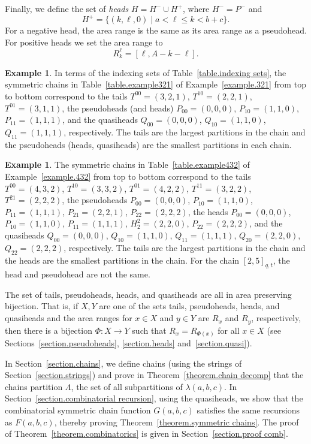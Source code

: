 \documentclass[11pt,reqno]{amsart}
\newcommand{\defn}[1]{{\color{darkred}\emph{#1}}} %
\theoremstyle{definition}
\newtheorem{example}[theorem]{Example}
\numberwithin{equation}{section}
\begin{document}
Finally, we define the set of \defn{heads} $H=H^- \cup H^+$, where 
$H^-=P^-$ and 
\[
	H^+ = \{(k,\ell,0) \mid a < \ell \leqslant k <b+c\}.
\]
For a negative head, the area range is the same as its area range as a pseudohead.  For positive heads we set the area 
range to
\[
	 R_k^\ell=[\ell, A-k-\ell].
\]

\begin{example}
In terms of the indexing sets of Table~\ref{table.indexing sets}, the symmetric chains 
in Table~\ref{table.example321} of Example~\ref{example.321} from top to bottom correspond to the tails 
$T^{00}=(3,2,1)$, $T^{10}=(2,2,1)$, $T^{01}=(3,1,1)$, 
the pseudoheads (and heads) $P_{00}=(0,0,0)$, $P_{10}=(1,1,0)$, $P_{11}=(1,1,1)$, 
and the quasiheads $Q_{00}=(0,0,0)$, $Q_{10}=(1,1,0)$, $Q_{11}=(1,1,1)$, 
respectively. The tails are the largest partitions in the chain and the pseudoheads (heads, quasiheads) are
the smallest partitions in each chain.
\end{example}

\begin{example}
The symmetric chains in Table~\ref{table.example432} of Example~\ref{example.432} from top to bottom correspond to 
the tails $T^{00}=(4,3,2)$, $T^{10}=(3,3,2)$, $T^{01}=(4,2,2)$, $T^{11}=(3,2,2)$, $T^{21}=(2,2,2)$, 
the pseudoheads $P_{00}=(0,0,0)$, $P_{10}=(1,1,0)$, $P_{11}=(1,1,1)$, $P_{21}=(2,2,1)$, $P_{22}=(2,2,2)$, 
the heads $P_{00}=(0,0,0)$, $P_{10}=(1,1,0)$, $P_{11}=(1,1,1)$, $H_2^2=(2,2,0)$, $P_{22}=(2,2,2)$,
and the quasiheads $Q_{00}=(0,0,0)$, $Q_{10}=(1,1,0)$, $Q_{11}=(1,1,1)$, $Q_{20}=(2,2,0)$, $Q_{22}=(2,2,2)$,
respectively. The tails are the largest partitions in the chain and the heads are the smallest partitions in the chain.
For the chain $[2,5]_{q,t}$, the head and pseudohead are not the same.
\end{example}

The set of tails, pseudoheads, heads, and quasiheads are all in area preserving bijection. That is, if $X,Y$ 
are one of the sets tails, pseudoheads, heads, and quasiheads and the area ranges for $x\in X$ and $y\in Y$ are $R_x$ 
and $R_y$, respectively, then there is a bijection $\Phi \colon X \to Y$ such that $R_x=R_{\Phi(x)}$ for all $x\in X$
(see Sections~\ref{section.pseudoheads}, \ref{section.heads} and~\ref{section.quasi}).

In Section~\ref{section.chains}, we define chains (using the strings of Section~\ref{section.strings})
and prove in Theorem~\ref{theorem.chain decomp} that the chains partition $\Lambda$, the set of all
subpartitions of $\lambda(a,b,c)$. In Section~\ref{section.combinatorial recursion}, using the quasiheads, 
we show that the combinatorial symmetric chain function $G(a,b,c)$ satisfies the same recursions as $F(a,b,c)$, 
thereby proving Theorem~\ref{theorem.symmetric chains}. The proof of Theorem~\ref{theorem.combinatorics}
is given in Section~\ref{section.proof comb}.
\end{document}

